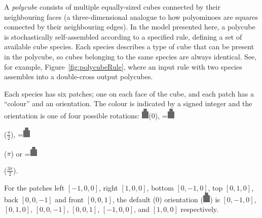 A \emph{polycube} consists of multiple equally-sized cubes connected by their neighbouring faces (a three-dimensional analogue to how polyominoes are squares connected by their neighbouring edges). In the model presented here, a polycube is stochastically self-assembled according to a specified rule, defining a set of available cube species. Each species describes a type of cube that can be present in the polycube, so cubes belonging to the same species are always identical. See, for example, Figure~\ref{fig:polycubeRule}, where an input rule with two species assembles into a double-cross output polycubes.

Each species has six patches; one on each face of the cube, and each patch has a ``colour'' and an orientation. The colour is indicated by a signed integer and the orientation is one of four possible rotations: \includegraphics[width=10pt]{figures/face.eps}\hspace{4pt}(\(0\)),
\begingroup{}=\hbox{\includegraphics[width=10pt,angle=-90]{figures/face.eps}}\parbox{\wd0}{}\endgroup\hspace{4pt}(\(\frac{\pi}{2}\)),
\begingroup{}=\hbox{\includegraphics[width=10pt,angle=180]{figures/face.eps}}\parbox{\wd0}{}\endgroup\hspace{4pt}(\(\pi\)) or
\begingroup{}=\hbox{\includegraphics[width=10pt,angle=90]{figures/face.eps}}\parbox{\wd0}{}\endgroup\hspace{4pt}(\(\frac{3\pi}{2}\)).

For the patches left \(\left[-1, 0, 0\right]\), right \(\left[1, 0, 0\right]\), bottom \(\left[0, -1, 0\right]\), top \(\left[0, 1, 0\right]\), back \(\left[0, 0, -1\right]\) and front \(\left[0, 0, 1\right]\), the default (\(0\)) orientation (\includegraphics[width=10pt]{figures/face.eps}) is \(\left[0, -1, 0\right]\), \(\left[0, 1, 0\right]\), \(\left[0, 0, -1\right]\), \(\left[0, 0, 1\right]\), \(\left[-1, 0, 0\right]\), and \(\left[1, 0, 0\right]\) respectively.

